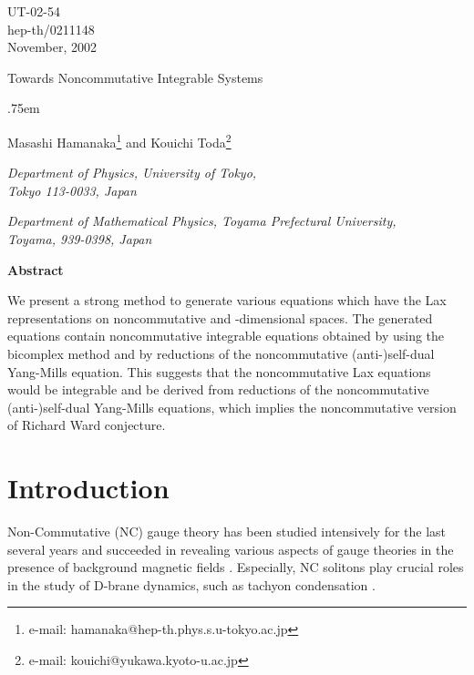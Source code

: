 \documentclass[a4paper,12pt]{article}\setlength{\topmargin}{-1cm}
\begin{document}
\begin{titlepage}
\null
\begin{flushright}
UT-02-54
\\
hep-th/0211148
\\
November, 2002
\end{flushright}

\vskip 1.5cm
\begin{center}

  {\LARGE Towards Noncommutative Integrable Systems}

\lineskip .75em
\vskip 2cm
\normalsize

  {\large Masashi Hamanaka\footnote{
e-mail: hamanaka@hep-th.phys.s.u-tokyo.ac.jp} and 
Kouichi Toda\footnote{e-mail: kouichi@yukawa.kyoto-u.ac.jp} }

\vskip 2cm

  {\it Department of Physics, University of Tokyo,\\
               Tokyo 113-0033, Japan}

\vskip 0.5cm

  {\it Department of Mathematical Physics,
Toyama Prefectural University,\\
Toyama, 939-0398, Japan}

\vskip 1.5cm

{\bf Abstract}

\end{center}

We present a strong method to generate various equations
which have the Lax representations 
on noncommutative \coordHE{} and \coordHE{}-dimensional spaces. 
The generated equations contain noncommutative integrable
equations obtained by using the bicomplex method
and by reductions of the noncommutative
(anti-)self-dual Yang-Mills equation.
This suggests that
the noncommutative Lax equations would be integrable
and be derived from reductions of the noncommutative 
(anti-)self-dual Yang-Mills equations,
which implies the noncommutative version of Richard Ward conjecture.

\end{titlepage}

\clearpage

\baselineskip 6mm

\section{Introduction}

Non-Commutative (NC) gauge theory has been studied intensively 
for the last several years 
and succeeded in revealing various aspects of gauge theories
in the presence of background magnetic fields \cite{DoNe}. 
Especially,
NC solitons play crucial roles in the study of D-brane
dynamics, such as tachyon condensation \cite{Harvey}.
 
\end{document}
